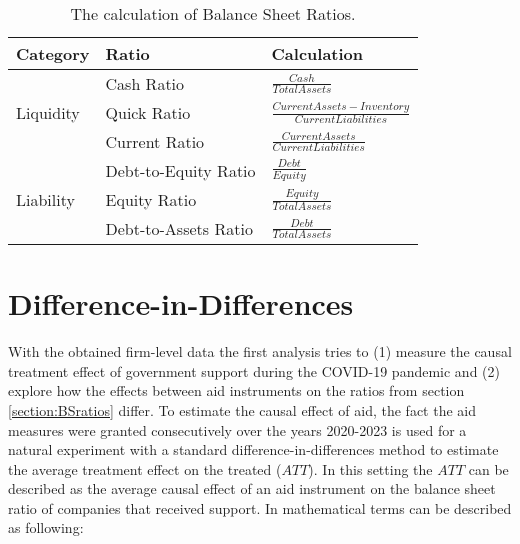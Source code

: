 \begin{table}%
    \caption{The calculation of Balance Sheet Ratios.}
    \label{tab:RatioCalc}
    \centering
    \def\arraystretch{1.5}
    \begin{tabular}{@{}lll@{}}
    \toprule
    Category                   & Ratio                & Calculation \\ \midrule
    \multirow{3}{*}{Liquidity} & Cash Ratio           & $\frac{Cash}{Total Assets}$ \\ %
                                & Quick Ratio          & $\frac{Current Assets-Inventory}{Current Liabilities}$ \\ %
                                & Current Ratio        & $\frac{Current Assets}{Current Liabilities}$ \\ \midrule
    \multirow{3}{*}{Liability} & Debt-to-Equity Ratio & $\frac{Debt}{Equity}$ \\ %
                                & Equity Ratio         & $\frac{Equity}{Total Assets}$ \\ %
                                & Debt-to-Assets Ratio & $\frac{Debt}{Total Assets}$ \\ \bottomrule
    \end{tabular}
    \end{table}











\section{Difference-in-Differences}

With the obtained firm-level data the first analysis tries to (1) measure the causal treatment effect of government support during the COVID-19 pandemic and (2) explore how the effects between aid instruments on the ratios from section \ref{section:BSratios} differ. To estimate the causal effect of aid, the fact the aid measures were granted consecutively over the years 2020-2023 is used for a natural experiment with a standard difference-in-differences method to estimate the average treatment effect on the treated ($ATT$). In this setting the $ATT$ can be described as the average causal effect of an aid instrument on the balance sheet ratio of companies that received support. In mathematical terms can be described as following:

